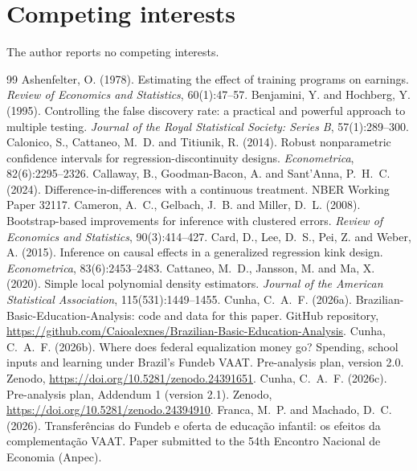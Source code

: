 \documentclass[11pt]{article}
\begin{document}
\section*{Competing interests}
The author reports no competing interests.

\begin{thebibliography}{99}
 Ashenfelter, O. (1978). Estimating the effect of training programs on earnings. \textit{Review of Economics and Statistics}, 60(1):47--57.
 Benjamini, Y. and Hochberg, Y. (1995). Controlling the false discovery rate: a practical and powerful approach to multiple testing. \textit{Journal of the Royal Statistical Society: Series B}, 57(1):289--300.
 Calonico, S., Cattaneo, M.~D. and Titiunik, R. (2014). Robust nonparametric confidence intervals for regression-discontinuity designs. \textit{Econometrica}, 82(6):2295--2326.
 Callaway, B., Goodman-Bacon, A. and Sant'Anna, P.~H.~C. (2024). Difference-in-differences with a continuous treatment. NBER Working Paper 32117.
 Cameron, A.~C., Gelbach, J.~B. and Miller, D.~L. (2008). Bootstrap-based improvements for inference with clustered errors. \textit{Review of Economics and Statistics}, 90(3):414--427.
 Card, D., Lee, D.~S., Pei, Z. and Weber, A. (2015). Inference on causal effects in a generalized regression kink design. \textit{Econometrica}, 83(6):2453--2483.
 Cattaneo, M.~D., Jansson, M. and Ma, X. (2020). Simple local polynomial density estimators. \textit{Journal of the American Statistical Association}, 115(531):1449--1455.
 Cunha, C.~A.~F. (2026a). Brazilian-Basic-Education-Analysis: code and data for this paper. GitHub repository, \url{https://github.com/Caioalexnes/Brazilian-Basic-Education-Analysis}.
 Cunha, C.~A.~F. (2026b). Where does federal equalization money go? Spending, school inputs and learning under Brazil's Fundeb VAAT. Pre-analysis plan, version 2.0. Zenodo, \url{https://doi.org/10.5281/zenodo.24391651}.
 Cunha, C.~A.~F. (2026c). Pre-analysis plan, Addendum 1 (version 2.1). Zenodo, \url{https://doi.org/10.5281/zenodo.24394910}.
 Franca, M.~P. and Machado, D.~C. (2026). Transferências do Fundeb e oferta de educação infantil: os efeitos da complementação VAAT. Paper submitted to the 54th Encontro Nacional de Economia (Anpec).

\end{thebibliography}
\end{document}
